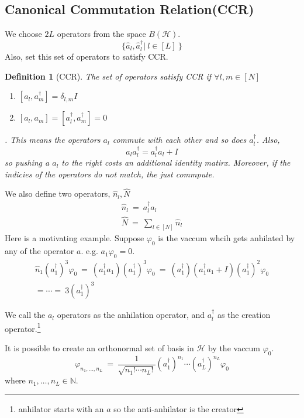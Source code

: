 \documentclass{article}
\newcommand{\NN}{\mathbb{N}}
\newcommand{\HH}{\mathcal{H}}
\newtheorem{definition}{Definition}
\numberwithin{equation}{section}
\begin{document}
\subsection{Canonical Commutation Relation(CCR)}
We choose $2L$ operators from the space $B(\HH)$. 
\begin{equation}
    \{ \hat a_l, \hat a^\dag_l| \ l \in [L] \ 
    \} 
\end{equation}
Also, set this set of operators to satisfy CCR. 
\begin{definition}[CCR]
    The set of operators satisfy CCR if $\forall l, m \in [N]$
    \begin{enumerate}
        \item $[a_l, a^\dag_m] = \delta_{l, m} I$
        \item $[a_l, a_m] = [a^\dag_l, a^\dag_m] = 0$
    \end{enumerate}
    . This means the operators $a_l$ commute with each other and so does 
    $a^\dag_l$. Also, 
    \begin{equation}
    a_l a^\dag_l = a_l^\dag a_l + I 
    \end{equation}
    so pushing a $a_l$ to the right costs an additional identity matirx. 
    Moreover, if the indicies of the operators do not match, the just 
    commpute. 
\end{definition}
We also define two operators, $\hat n_l, \hat N$
\begin{eqnarray}
    \hat n_l \ = \ a^\dag_l a_l \nonumber\\ 
    \hat N \ = \ \sum_{l \in [N]} \hat n_l
\end{eqnarray}
Here is a motivating example. Suppose $\varphi_0$ is the vaccum whcih 
gets anhilated by any of the operator $a$. e.g. $a_1\varphi_0 = 0$. 
\begin{eqnarray}
    \hat n_1 (a^\dag_1)^3 \varphi_0\ = \ 
    (a^\dag_1 a_1) (a^\dag_1)^3\varphi_0 \ =\ 
    (a^\dag_1)(a^\dag_1 a_1 + I)(a^\dag _1)^2\varphi_0 \nonumber\\ 
    = \cdots = \ 3 (a_1^\dag)^3
\end{eqnarray}

We call the $a_l$ operators as the anhilation operator, and 
$a_l^\dag$ as the creation operator.\footnote{anhilator starts with 
an $a$ so the anti-anhilator is the creator}

It is possible to create an orthonormal set of basis in $\HH$ by the 
vaccum $\varphi_0$. 
\begin{equation}
    \varphi_{n_1, \dots, n_L} \ = \ 
    \frac {1} {\sqrt{
            n_1! \cdots n_L!
        }}
    (a_1^\dag)^{n_1}  \cdots
    (a_L^\dag)^{n_L} 
    \varphi_0 
\end{equation}
where $n_1, \dots, n_L \in \NN$. 
\end{document}
